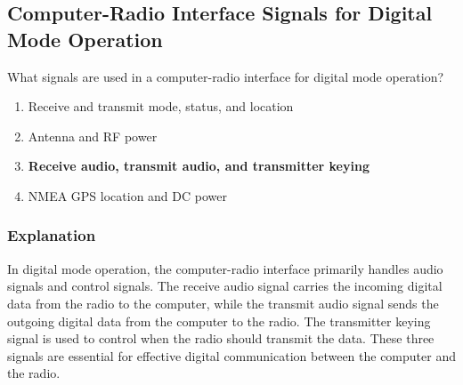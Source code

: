 \subsection{Computer-Radio Interface Signals for Digital Mode Operation}
\label{T4A06}

\begin{tcolorbox}[colback=gray!10!white,colframe=black!75!black,title=T4A06]
What signals are used in a computer-radio interface for digital mode operation?
\begin{enumerate}[noitemsep]
    \item Receive and transmit mode, status, and location
    \item Antenna and RF power
    \item \textbf{Receive audio, transmit audio, and transmitter keying}
    \item NMEA GPS location and DC power
\end{enumerate}
\end{tcolorbox}

\subsubsection*{Explanation}
In digital mode operation, the computer-radio interface primarily handles audio signals and control signals. The receive audio signal carries the incoming digital data from the radio to the computer, while the transmit audio signal sends the outgoing digital data from the computer to the radio. The transmitter keying signal is used to control when the radio should transmit the data. These three signals are essential for effective digital communication between the computer and the radio.